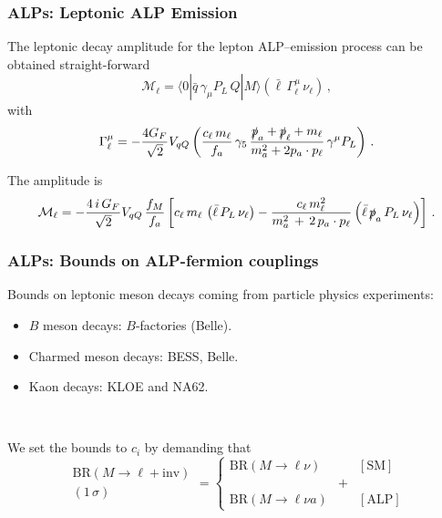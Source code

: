 \documentclass[mathserif, 10pt, dvipsnames]{beamer}
\begin{document}
\begin{frame}\frametitle{ALPs: Leptonic ALP Emission}
    The leptonic decay amplitude for the lepton ALP--emission process can be obtained straight-forward
    $$ \mathcal{M}_\ell =  \langle 0|\bar{q}\,\gamma_\mu  P_L\,Q |M\rangle \left(\bar{\ell} \,\Gamma^\mu_\ell \,\nu_\ell \right) \,,
    $$
    with
    $$
        \Gamma^\mu_\ell = - \frac{4 G_F}{\sqrt{2}} V_{qQ}
        \left(\frac{c_\ell\,m_\ell}{f_a}\,\gamma_5\,\frac{\slashed{p}_a+\slashed{p}_\ell+m_\ell}{m_a^2 + 2 p_a \cdot p_\ell}\,\gamma^\mu P_L \right)\,.$$

    The amplitude is
    $$\mathcal{M}_\ell = - \frac{4\,i\, G_F}{\sqrt{2}} V_{qQ} \,\frac{f_M}{f_a}  \left[  c_\ell\,m_\ell\, \left(\bar{\ell} \, P_L \,\nu_\ell \right) -
            \frac{ c_\ell \, m^2_\ell}{m_a^2\,+\, 2\,p_a\cdot p_\ell} \left(\bar{\ell} \, \slashed{p}_a\, P_L \,\nu_\ell \right) \right] \,.$$
\end{frame}

\begin{frame} \frametitle{ALPs: Bounds on ALP-fermion couplings}
    Bounds on leptonic meson decays coming from particle physics experiments:
    \begin{itemize}
        \item $B$ meson decays: $B$-factories (Belle).
        \item Charmed meson decays: BESS, Belle.
        \item Kaon decays: KLOE and NA62.
    \end{itemize}

    ~

    We set the bounds to $c_i$ by demanding that
    $$
        \begin{matrix}
            \mathrm{BR}(M\to \ell + \mathrm{inv}) \\
            (1\,\sigma)
        \end{matrix} = \left\{ \begin{matrix}
            \mathrm{BR}(M\to \ell \nu)   &   & [\mathrm{SM}]  \\
                                         & + &                \\
            \mathrm{BR}(M\to \ell \nu a) &   & [\mathrm{ALP}]
        \end{matrix} \right.
    $$

\end{frame}
\end{document}
